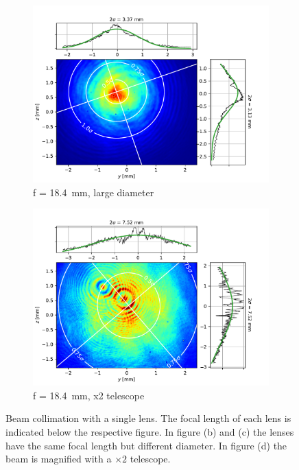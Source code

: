 \begin{figure}[t!]
\begin{subfigure}{0.5\textwidth}
        \centering
        \includegraphics[width=\textwidth]{chapters/chapter_3/figures/beam_f18.4_large.pdf}
        \caption{f = \SI{18.4}{mm}, large diameter}
        \label{fig:beam_f18.4_large}
    \end{subfigure}
    \begin{subfigure}{0.5\textwidth}
        \centering
        \includegraphics[width=\textwidth]{chapters/chapter_3/figures/beam_f18.4x2.pdf}
        \caption{f = \SI{18.4}{mm}, x2 telescope}
        \label{fig:beam_f18.4x2}
    \end{subfigure}
    \caption{Beam collimation with a single lens. The focal length of each lens is indicated below the respective figure. In figure (b) and (c) the lenses have the same focal length but different diameter. In figure (d) the beam is magnified with a $\times 2$ telescope.}
\end{figure}

